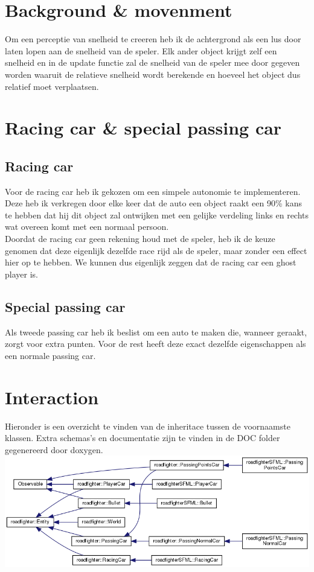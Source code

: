 \documentclass[12pt,a4paper]{article}
\begin{document}
\section{Background \& movenment}
Om een perceptie van snelheid te creeren heb ik de achtergrond als een lus door laten lopen aan de snelheid van de speler. Elk ander object krijgt zelf een snelheid en in de update functie zal de snelheid van de speler mee door gegeven worden waaruit de relatieve snelheid wordt berekende en hoeveel het object dus relatief moet verplaatsen.

\section{Racing car \& special passing car}
\subsection{Racing car}
Voor de racing car heb ik gekozen om een simpele autonomie te implementeren. Deze heb ik verkregen door elke keer dat de auto een object raakt een 90\% kans te hebben dat hij dit object zal ontwijken met een gelijke verdeling links en rechts wat overeen komt met een normaal persoon.\\
Doordat de racing car geen rekening houd met de speler, heb ik de keuze genomen dat deze eigenlijk dezelfde race rijd als de speler, maar zonder een effect hier op te hebben. We kunnen dus eigenlijk zeggen dat de racing car een ghost player is. 

\subsection{Special passing car}
Als tweede passing car heb ik beslist om een auto te maken die, wanneer geraakt, zorgt voor extra punten. Voor de rest heeft deze exact dezelfde eigenschappen als een normale passing car.

\section{Interaction}
Hieronder is een overzicht te vinden van de inheritace tussen de voornaamste klassen. Extra schemas's en documentatie zijn te vinden in de DOC folder gegenereerd door doxygen.\\
\includegraphics[scale=0.5]{img/inherit_graph_2.png}
\end{document}
